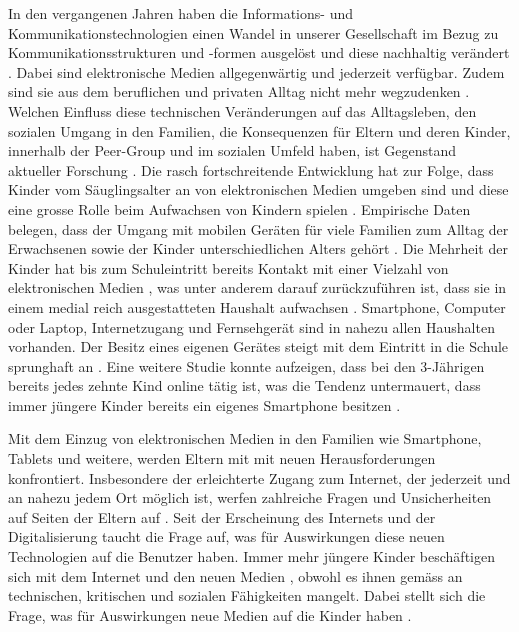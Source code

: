 In den vergangenen Jahren haben die Informations- und Kommunikationstechnologien einen Wandel in unserer Gesellschaft im Bezug zu Kommunikationsstrukturen und -formen ausgelöst und diese nachhaltig verändert \cite{Hasebrink2009, Bms2013}. Dabei sind elektronische Medien allgegenwärtig und jederzeit verfügbar. Zudem sind sie aus dem beruflichen und privaten Alltag nicht mehr wegzudenken \cite{Bmfsfj2013}. Welchen Einfluss diese technischen Veränderungen auf das Alltagsleben, den sozialen Umgang in den Familien, die Konsequenzen für Eltern und deren Kinder, innerhalb der Peer-Group und im sozialen Umfeld haben, ist Gegenstand aktueller Forschung \cite{Olafsson2014}. Die rasch fortschreitende Entwicklung hat zur Folge, dass Kinder vom Säuglingsalter an von elektronischen Medien umgeben sind und diese eine grosse Rolle beim Aufwachsen von Kindern spielen \cite{Feierabend2015, Divsi2015}. Empirische Daten belegen, dass der Umgang mit mobilen Geräten für viele Familien zum Alltag der Erwachsenen sowie der Kinder unterschiedlichen Alters gehört \cite{Wagner2016}. Die Mehrheit der Kinder hat bis zum Schuleintritt bereits Kontakt mit einer Vielzahl von elektronischen Medien \cite{Feierabend2015}, was unter anderem darauf zurückzuführen ist, dass sie in einem medial reich ausgestatteten Haushalt aufwachsen \cite{Suter2015}. Smartphone, Computer oder Laptop, Internetzugang und Fernsehgerät sind in nahezu allen Haushalten vorhanden. Der Besitz eines eigenen Gerätes steigt mit dem Eintritt in die Schule sprunghaft an \cite{Feierabend2015a}. Eine weitere Studie konnte aufzeigen, dass bei den 3-Jährigen bereits jedes zehnte Kind online tätig ist, was die Tendenz untermauert, dass immer jüngere Kinder bereits ein eigenes Smartphone besitzen \cite{Divsi2015}. 

Mit dem Einzug von elektronischen Medien in den Familien wie Smartphone, Tablets und weitere, werden Eltern mit mit neuen Herausforderungen konfrontiert. Insbesondere der erleichterte Zugang zum Internet, der jederzeit und an nahezu jedem Ort möglich ist, werfen zahlreiche Fragen und Unsicherheiten auf Seiten der Eltern auf \cite{Wagner2016}. Seit der Erscheinung des Internets und der Digitalisierung taucht die Frage auf, was für Auswirkungen diese neuen Technologien auf die Benutzer haben. Immer mehr jüngere Kinder beschäftigen sich mit dem Internet und den neuen Medien \cite{Rideout2013a, Chaudron2015}, obwohl es ihnen gemäss  an technischen, kritischen und sozialen Fähigkeiten mangelt. Dabei stellt sich die Frage, was für Auswirkungen neue Medien auf die Kinder haben \cite{Tomopoulos2010, Pempek2014, Livingstone2015, Masur2015, Troseth2016}. 

